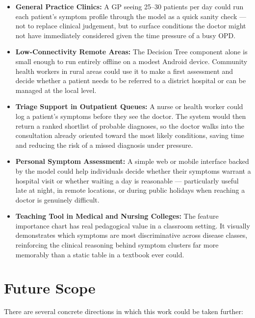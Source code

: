 \documentclass[12pt,a4paper]{article}
\begin{document}
\begin{itemize}
    \item \textbf{General Practice Clinics:} A GP seeing 25--30 patients per day could run each patient's symptom profile through the model as a quick sanity check --- not to replace clinical judgement, but to surface conditions the doctor might not have immediately considered given the time pressure of a busy OPD.
    \item \textbf{Low-Connectivity Remote Areas:} The Decision Tree component alone is small enough to run entirely offline on a modest Android device. Community health workers in rural areas could use it to make a first assessment and decide whether a patient needs to be referred to a district hospital or can be managed at the local level.
    \item \textbf{Triage Support in Outpatient Queues:} A nurse or health worker could log a patient's symptoms before they see the doctor. The system would then return a ranked shortlist of probable diagnoses, so the doctor walks into the consultation already oriented toward the most likely conditions, saving time and reducing the risk of a missed diagnosis under pressure.
    \item \textbf{Personal Symptom Assessment:} A simple web or mobile interface backed by the model could help individuals decide whether their symptoms warrant a hospital visit or whether waiting a day is reasonable --- particularly useful late at night, in remote locations, or during public holidays when reaching a doctor is genuinely difficult.
    \item \textbf{Teaching Tool in Medical and Nursing Colleges:} The feature importance chart has real pedagogical value in a classroom setting. It visually demonstrates which symptoms are most discriminative across disease classes, reinforcing the clinical reasoning behind symptom clusters far more memorably than a static table in a textbook ever could.
\end{itemize}

\section{Future Scope}

There are several concrete directions in which this work could be taken further:
\end{document}
